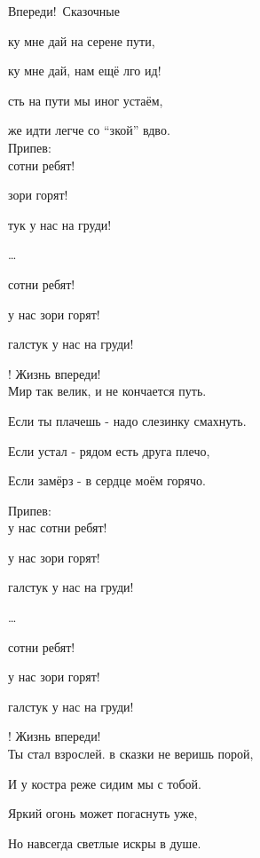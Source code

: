 \documentclass[11pt,a5paper]{book}
\renewcommand{\tt}{\indent \indent}
\begin{document}
\begin{song}{Впереди!}{}{~}{Сказочные}{}{}

ку мне дай на серене пути,\par
{}ку мне дай, нам ещё лго ид!\par
{}сть на пути мы иног устаём,\par
{} же идти легче со “зкой” вдво.\\ 

Припев:\\
 сотни ребят!\par
{} зори горят!\par
{} тук у нас на груди!\par
{}…\par
{} сотни ребят!\par
{} у нас зори горят!\par
{} галстук у нас на груди!\par
{}! Жизнь впереди!\\

Мир так велик, и не кончается путь.\par
Если ты плачешь - надо слезинку смахнуть.\par
Если устал - рядом есть друга плечо,\par
Если замёрз - в сердце моём горячо.\\

\newpage

Припев:\\
 у нас сотни ребят!\par
{} у нас зори горят!\par
{} галстук у нас на груди!\par
{}…\par
{} сотни ребят!\par
{} у нас зори горят!\par
{} галстук у нас на груди!\par
{}! Жизнь впереди!\\

Ты стал взрослей. в сказки не веришь порой,\par
И у костра реже сидим мы с тобой.\par
Яркий огонь может погаснуть уже,\par
Но навсегда светлые искры в душе.\\


\end{song}
\end{document}
